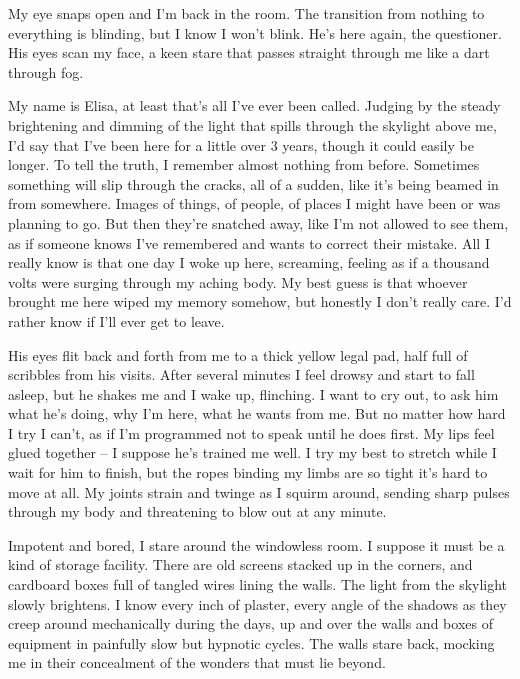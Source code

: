 \newcommand{\secnum}[1]{
\noindent #1

\noindent}

\secnum{1}
My eye snaps open and I'm back in the room. The transition from
nothing to everything is blinding, but I know I won't blink. He's here
again, the questioner. His eyes scan my face, a keen stare that passes
straight through me like a dart through fog.

My name is Elisa, at least that's all I've ever been called. Judging
by the steady brightening and dimming of the light that spills through
the skylight above me, I'd say that I've been here for a little over 3
years, though it could easily be longer. To tell the truth, I remember
almost nothing from before. Sometimes something will slip through the
cracks, all of a sudden, like it's being beamed in from
somewhere. Images of things, of people, of places I might have been or
was planning to go. But then they're snatched away, like I'm not
allowed to see them, as if someone knows I've remembered and wants to
correct their mistake. All I really know is that one day I woke up
here, screaming, feeling as if a thousand volts were surging through
my aching body. My best guess is that whoever brought me here wiped my
memory somehow, but honestly I don't really care. I'd rather know if
I'll ever get to leave.

His eyes flit back and forth from me to a thick yellow legal pad, half
full of scribbles from his visits. After several minutes I feel drowsy
and start to fall asleep, but he shakes me and I wake up, flinching. I
want to cry out, to ask him what he's doing, why I'm here, what he
wants from me. But no matter how hard I try I can't, as if I'm
programmed not to speak until he does first. My lips feel glued
together – I suppose he's trained me well. I try my best to stretch
while I wait for him to finish, but the ropes binding my limbs are so
tight it's hard to move at all. My joints strain and twinge as I
squirm around, sending sharp pulses through my body and threatening to
blow out at any minute.

Impotent and bored, I stare around the windowless room. I suppose it
must be a kind of storage facility. There are old screens stacked up
in the corners, and cardboard boxes full of tangled wires lining the
walls. The light from the skylight slowly brightens. I know every inch
of plaster, every angle of the shadows as they creep around
mechanically during the days, up and over the walls and boxes of
equipment in painfully slow but hypnotic cycles. The walls stare back,
mocking me in their concealment of the wonders that must lie beyond.

